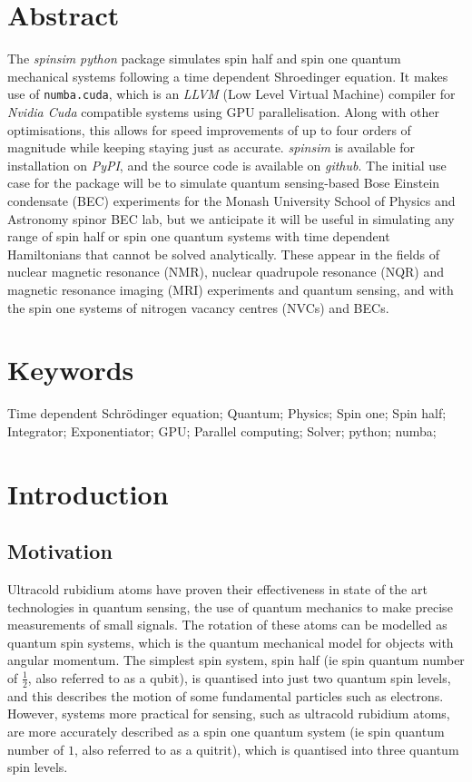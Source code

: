 \documentclass{jors}
\begin{document}
\section{Abstract}
	The \emph{spinsim} \emph{python} package simulates spin half and spin one quantum mechanical systems following a time dependent Shroedinger equation.
	It makes use of \texttt{numba.cuda}\cite{lam_numba_2015}, which is an \emph{LLVM} (Low Level Virtual Machine)\cite{lattner_llvm_2004} compiler for \emph{Nvidia Cuda}\cite{nickolls_scalable_2008} compatible systems using GPU parallelisation. 
	Along with other optimisations, this allows for speed improvements of up to four orders of magnitude while keeping staying just as accurate.
	\emph{spinsim} is available for installation on \emph{PyPI}, and the source code is available on \emph{github}.
	The initial use case for the package will be to simulate quantum sensing-based Bose Einstein condensate (BEC) experiments for the Monash University School of Physics and Astronomy spinor BEC lab, but we anticipate it will be useful in simulating any range of spin half or spin one quantum systems with time dependent Hamiltonians that cannot be solved analytically.
	These appear in the fields of nuclear magnetic resonance (NMR), nuclear quadrupole resonance (NQR) and magnetic resonance imaging (MRI) experiments and quantum sensing, and with the spin one systems of nitrogen vacancy centres (NVCs) and BECs.

\section{Keywords}
Time dependent Schr\"odinger equation; Quantum; Physics; Spin one; Spin half; Integrator; Exponentiator; GPU; Parallel computing; Solver; python; numba;

\section{Introduction}
\subsection{Motivation}
	Ultracold rubidium atoms have proven their effectiveness in state of the art technologies in quantum sensing\cite{degen_quantum_2017}, the use of quantum mechanics to make precise measurements of small signals.
	The rotation of these atoms can be modelled as quantum spin systems, which is the quantum mechanical model for objects with angular momentum.
	The simplest spin system, spin half (ie spin quantum number of \(\frac12\), also referred to as a qubit), is quantised into just two quantum spin levels, and this describes the motion of some fundamental particles such as electrons.
	However, systems more practical for sensing, such as ultracold rubidium atoms, are more accurately described as a spin one quantum system (ie spin quantum number of \(1\), also referred to as a quitrit), which is quantised into three quantum spin levels.
	
\end{document}
